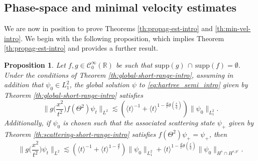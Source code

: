 \documentclass[12pt]{article}
\theoremstyle{plain}
\newtheorem{prop}[theo]{Proposition}
\begin{document}
\subsection{Phase-space and minimal velocity estimates}

We are now in position to prove Theorems \ref{th:propag-est-intro} and \ref{th:min-vel-intro}. We begin with the following proposition, which implies Theorem \ref{th:propag-est-intro} and provides a further result.

\begin{prop}\label{th:propag-estim}
Let $f,g\in \mathcal{C}_0^\infty(\mathbb{R})$ be such that $\mathrm{supp}(g)\,\cap\,\mathrm{supp}(f)=\emptyset$. Under the conditions of Theorem \ref{th:global-short-range-intro}, assuming in addition that $\psi_0\in L_1^2$,  
the global solution $\psi$ to \eqref{eq:hartree_semi_intro} given by Theorem \ref{th:global-short-range-intro} satisfies
\begin{equation}\label{eq:propag1}
\Big\|g\Big(\frac{x^2}{t^2}\Big)f(\Theta^2) \psi_t\Big\|_{L^2} \lesssim(\langle t \rangle^{-1} + \langle  t\rangle^{1-\frac dr \theta(\frac{r}{q})})\|\psi_0\|_{L_1^2}.
\end{equation}
Additionally, if $\psi_0$ is chosen such that the associated scattering state $\psi_+$ given by Theorem \ref{th:scattering-short-range-intro} satisfies $f(\Theta^2)\psi_+=\psi_+$, then
\begin{equation}\label{eq:propag2}
\Big\|g\Big(\frac{x^2}{t^2}\Big) \psi_t\Big\|_{L^2} \lesssim (\langle t \rangle^{-1} + \langle  t\rangle^{1-\frac dr})\|\psi_0\|_{L^2_1} + \langle t\rangle^{1-\frac dr \theta(\frac{r}{q})} \|\psi_0\|_{H^s\cap H^{s,p'}}.
\end{equation}
\end{prop}
\end{document}
